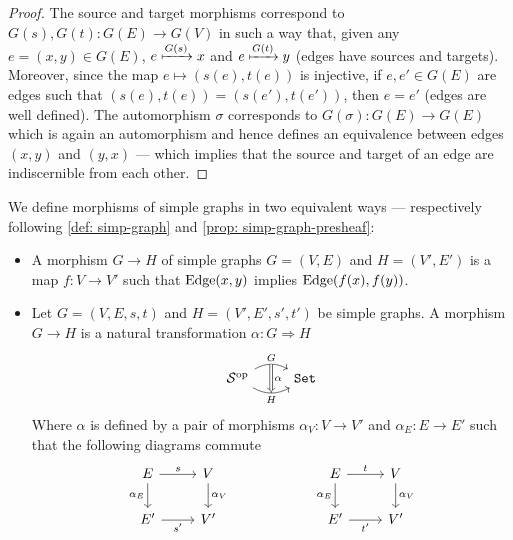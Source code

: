 \begin{proof}
  The source and target morphisms correspond to \(G(s), G(t): G(E) \to G(V)\) in
  such a way that, given any \(e = (x, y) \in G(E)\), \(e \xmapsto{G(s)} x\) and
  \(e \xmapsto{G(t)} y\) (edges have sources and targets). Moreover, since the
  map \(e \mapsto (s(e), t(e))\) is injective, if \(e, e' \in G(E)\) are edges
  such that \((s(e), t(e)) = (s(e'), t(e'))\), then \(e = e'\) (edges are well
  defined). The automorphism \(\sigma\) corresponds to \(G(\sigma): G(E) \to
  G(E)\) which is again an automorphism and hence defines an equivalence between
  edges \((x, y)\) and \((y, x)\) --- which implies that the source and target
  of an edge are indiscernible from each other.
\end{proof}

\begin{definition}
  We define morphisms of simple graphs in two equivalent ways --- respectively
  following \cref{def: simp-graph} and \cref{prop: simp-graph-presheaf}:
  \begin{itemize}
    \setlength\itemsep{0em}
    \item A morphism \(G \to H\) of simple graphs \(G = (V, E)\) and \(H = (V',
      E')\) is a map \(f: V \to V'\) such that \(\operatorname{Edge}(x, y)\) implies \(\operatorname{Edge}(f(x),
      f(y))\).
    \item Let \(G = (V, E, s, t)\) and \(H = (V', E', s', t')\) be simple
      graphs. A morphism \(G \to H\) is a natural transformation \(\alpha: G \Rightarrow H\)
      \[
        \begin{tikzcd}
          \cat S^\op
          \ar[r, bend left, "G", ""{name=G}]
          \ar[r, bend right, swap, "H", ""{name=H}]
          &\Set
          \ar[Rightarrow, "\alpha", from=G, to=H]
        \end{tikzcd}
      \]
      Where \(\alpha\) is defined by a pair of morphisms \(\alpha_V: V \to V'\)
      and \(\alpha_E: E \to E'\) such that the following diagrams commute
      \[
        \begin{tikzcd}
          E \ar[r, "s"] \ar[d, swap, "\alpha_E"] &V \ar[d, "\alpha_V"]
          \\
          E' \ar[r, swap, "s'"] &V'
        \end{tikzcd}
        \qquad \qquad \qquad
        \begin{tikzcd}
          E \ar[r, "t"] \ar[d, swap, "\alpha_E"] &V \ar[d, "\alpha_V"]
          \\
          E' \ar[r, swap, "t'"] &V'

\end{tikzcd}\]
\end{itemize}
\end{definition}
